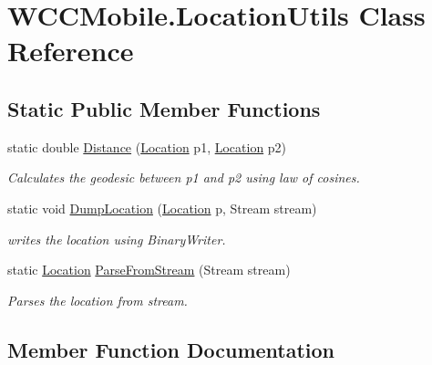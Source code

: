 \hypertarget{class_w_c_c_mobile_1_1_location_utils}{}\section{W\+C\+C\+Mobile.\+Location\+Utils Class Reference}
\label{class_w_c_c_mobile_1_1_location_utils}
\subsection*{Static Public Member Functions}
\begin{DoxyCompactItemize}
\item 
static double \hyperlink{class_w_c_c_mobile_1_1_location_utils_a2dece4c8bb1149688a0724e6a91ff39b}{Distance} (\hyperlink{struct_w_c_c_mobile_1_1_location}{Location} p1, \hyperlink{struct_w_c_c_mobile_1_1_location}{Location} p2)
\begin{DoxyCompactList}\small\item\em Calculates the geodesic between {\itshape p1}  and {\itshape p2}  using law of cosines. \end{DoxyCompactList}\item 
static void \hyperlink{class_w_c_c_mobile_1_1_location_utils_aced59b8c81cbeed0cbf0818add183418}{Dump\+Location} (\hyperlink{struct_w_c_c_mobile_1_1_location}{Location} p, Stream stream)
\begin{DoxyCompactList}\small\item\em writes the location using Binary\+Writer. \end{DoxyCompactList}\item 
static \hyperlink{struct_w_c_c_mobile_1_1_location}{Location} \hyperlink{class_w_c_c_mobile_1_1_location_utils_a2ca1849312e2cf045c77750043a2fe58}{Parse\+From\+Stream} (Stream stream)
\begin{DoxyCompactList}\small\item\em Parses the location from stream. \end{DoxyCompactList}\end{DoxyCompactItemize}


\subsection{Member Function Documentation}

